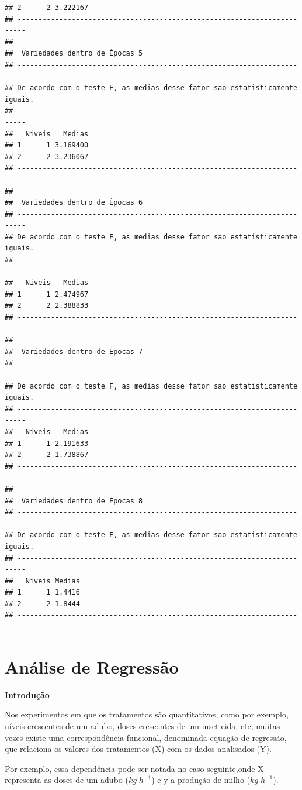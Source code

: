 \documentclass[
]{book}
\begin{document}
\begin{verbatim}
## 2      2 3.222167
## ------------------------------------------------------------------------
## 
##  Variedades dentro de Épocas 5
## ------------------------------------------------------------------------
## De acordo com o teste F, as medias desse fator sao estatisticamente iguais.
## ------------------------------------------------------------------------
##   Niveis   Medias
## 1      1 3.169400
## 2      2 3.236067
## ------------------------------------------------------------------------
## 
##  Variedades dentro de Épocas 6
## ------------------------------------------------------------------------
## De acordo com o teste F, as medias desse fator sao estatisticamente iguais.
## ------------------------------------------------------------------------
##   Niveis   Medias
## 1      1 2.474967
## 2      2 2.388833
## ------------------------------------------------------------------------
## 
##  Variedades dentro de Épocas 7
## ------------------------------------------------------------------------
## De acordo com o teste F, as medias desse fator sao estatisticamente iguais.
## ------------------------------------------------------------------------
##   Niveis   Medias
## 1      1 2.191633
## 2      2 1.738867
## ------------------------------------------------------------------------
## 
##  Variedades dentro de Épocas 8
## ------------------------------------------------------------------------
## De acordo com o teste F, as medias desse fator sao estatisticamente iguais.
## ------------------------------------------------------------------------
##   Niveis Medias
## 1      1 1.4416
## 2      2 1.8444
## ------------------------------------------------------------------------
\end{verbatim}

\hypertarget{anuxe1lise-de-regressuxe3o}{%
\chapter{Análise de Regressão}\label{anuxe1lise-de-regressuxe3o}}

\textbf{Introdução}

Nos experimentos em que os tratamentos são quantitativos, como por exemplo, níveis crescentes de um adubo, doses crescentes de um inseticida, etc, muitas vezes existe uma correspondência funcional, denominada equação de regressão, que relaciona os valores dos tratamentos (X) com os dados analisados (Y).

Por exemplo, essa dependência pode ser notada no caso seguinte,onde X representa as doses de um adubo (\(kg\;h^{-1}\)) e y a produção de milho (\(kg\;h^{-1}\)).
\end{document}

